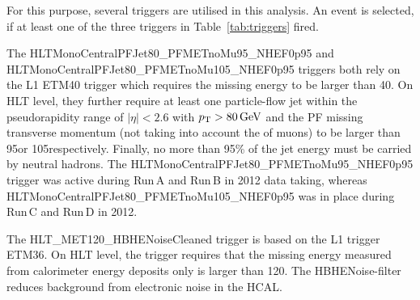 For this purpose, several triggers are utilised in this analysis.
An event is selected, if at least one of the three triggers in Table~\ref{tab:triggers} fired.
%
\renewcommand{\arraystretch}{1.5}
\begin{table}[!hbt]
\centering
\caption{\met and \met+ jet triggers used in this analysis together with the corresponding recorded integrated luminosity during the time when they were in place.}
\label{tab:triggers}
\end{table}  

The HLTMonoCentralPFJet80\_PFMETnoMu95\_NHEF0p95 and HLTMonoCentralPFJet80\_PFMETnoMu105\_NHEF0p95 triggers both rely on the L1 ETM40 trigger which requires the missing energy to be larger than 40\gev.
On HLT level, they further require at least one particle-flow jet within the pseudorapidity range of $|\eta|<2.6$ with $p_{\text{T}}>80\,\text{Ge}\kern-0.06667em\text{V}$ and the PF missing transverse momentum (not taking into account the \pt of muons) to be larger than 95\gev or 105\gev respectively.
Finally, no more than 95\% of the jet energy must be carried by neutral hadrons.
The HLTMonoCentralPFJet80\_PFMETnoMu95\_NHEF0p95 trigger was active during Run\,A and Run\,B in 2012 data taking, whereas HLTMonoCentralPFJet80\_PFMETnoMu105\_NHEF0p95 was in place during Run\,C and Run\,D in 2012.

The HLT\_MET120\_HBHENoiseCleaned trigger is based on the L1 trigger ETM36. %
On HLT level, the trigger requires that the missing energy measured from calorimeter energy deposits only is larger than 120\gev.
The HBHENoise-filter reduces background from electronic noise in the HCAL.

